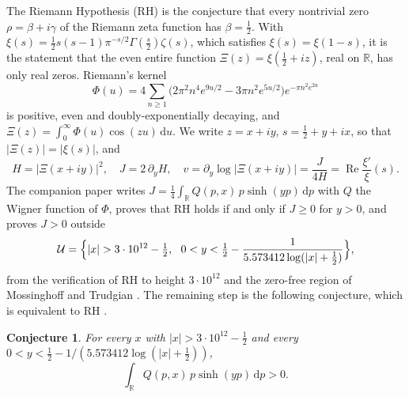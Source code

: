 \documentclass[11pt]{article}
\newtheorem{conjecture}{Conjecture}
\theoremstyle{definition}\newtheorem{definition}[theorem]{Definition}
\theoremstyle{remark}\newtheorem{remark}[theorem]{Remark}
\newcommand{\R}{\mathbb R}\newcommand{\C}{\mathbb C}\newcommand{\N}{\mathbb N}
\newcommand{\dd}{\,\mathrm d}\newcommand{\e}{\mathrm e}
\renewcommand{\Re}{\operatorname{Re}}\renewcommand{\Im}{\operatorname{Im}}
\begin{document}
The Riemann Hypothesis (RH) is the conjecture that every nontrivial zero $\rho=\beta+i\gamma$ of the Riemann zeta function has $\beta=\frac12$. With $\xi(s)=\frac12s(s-1)\pi^{-s/2}\Gamma(\frac s2)\zeta(s)$, which satisfies $\xi(s)=\xi(1-s)$, it is the statement that the even entire function $\Xi(z)=\xi(\frac12+iz)$, real on $\R$, has only real zeros. Riemann's kernel
\begin{equation}\label{eq:Phi}
\Phi(u)=4\sum_{n\ge1}\bigl(2\pi^2n^4e^{9u/2}-3\pi n^2e^{5u/2}\bigr)e^{-\pi n^2e^{2u}}
\end{equation}
is positive, even and doubly-exponentially decaying, and $\Xi(z)=\int_0^\infty\Phi(u)\cos(zu)\dd u$. We write $z=x+iy$, $s=\frac12+y+ix$, so that $|\Xi(z)|=|\xi(s)|$, and
\[
H=|\Xi(x+iy)|^2,\quad J=2\,\partial_yH,\quad v=\partial_y\log|\Xi(x+iy)|=\frac J{4H}=\Re\frac{\xi'}{\xi}(s).
\]
The companion paper \cite{S01} writes $J=\frac14\int_\R Q(p,x)\,p\sinh(yp)\dd p$ with $Q$ the Wigner function of $\Phi$, proves that RH holds if and only if $J\ge0$ for $y>0$, and proves $J>0$ outside
\[
\mathcal U=\Bigl\{|x|>3\cdot10^{12}-\tfrac12,\ \ 0<y<\tfrac12-\frac1{5.573412\log(|x|+\frac12)}\Bigr\},
\]
from the verification of RH to height $3\cdot10^{12}$ \cite{PT} and the zero-free region of Mossinghoff and Trudgian \cite{MT}. The remaining step is the following conjecture, which is equivalent to RH \cite[Conjecture~1]{S01}.

\begin{conjecture}\label{conj:1}
For every $x$ with $|x|>3\cdot10^{12}-\frac12$ and every $0<y<\frac12-1/(5.573412\log(|x|+\frac12))$,
\[
\int_\R Q(p,x)\,p\sinh(yp)\dd p>0 .
\]
\end{conjecture}
\end{document}
